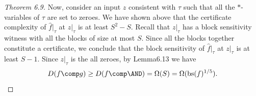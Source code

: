 \begin{proof}[Theorem 6.9]
Now, consider an input $z$ consistent with $\tau$ such that all the $*$-variables of $\tau$ are set to zeroes. We have shown above that the certificate complexity of $\hat f|_\tau$ at $z|_\tau$ is at least $S^2-S$. Recall that $z|_\tau$ has a block sensitivity witness with all the blocks of size at most $S$. Since all the blocks together constitute a certificate, we conclude that the block sensitivity of $\hat f|_\tau$ at $z|_\tau$ is at least $S-1$. Since $z|_\tau$ is the all zeroes, by Lemma6.13 we have
\[D(f\comp g)\ge D(f\comp\AND)=\Omega(S)=\Omega(\operatorname{bs}(f)^{1/5}).\]
\end{proof}
